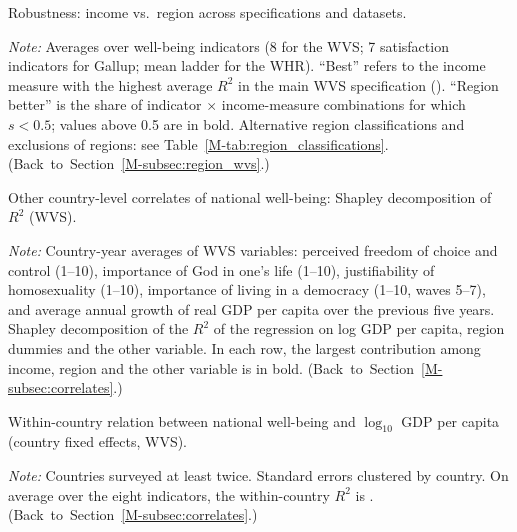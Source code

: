 \documentclass[12pt]{article}
\begin{document}
\begin{table}[htbp]
    \centering
    \caption{Robustness: income vs.\ region across specifications and datasets.}\label{tab:robustness}
    \begin{adjustbox}{max width=\textwidth}
    
    \end{adjustbox}
    \begin{minipage}{\textwidth}\footnotesize \textit{Note:} Averages over well-being indicators (8 for the WVS; 7 satisfaction indicators for Gallup; mean ladder for the WHR). ``Best'' refers to the income measure with the highest average $R^2$ in the main WVS specification (\bestIncome). ``Region better'' is the share of indicator $\times$ income-measure combinations for which $s < 0.5$; values above 0.5 are in bold. Alternative region classifications and exclusions of regions: see Table~\ref{M-tab:region_classifications}. \hfill(Back~to~Section~\ref{M-subsec:region_wvs}.)\end{minipage}
\end{table}

\begin{table}[htbp]
    \centering
    \caption{Other country-level correlates of national well-being: Shapley decomposition of $R^2$ (WVS).}\label{tab:correlates}
    \begin{adjustbox}{max width=\textwidth}
    
    \end{adjustbox}
    \begin{minipage}{\textwidth}\footnotesize \textit{Note:} Country-year averages of WVS variables: perceived freedom of choice and control (1--10), importance of God in one's life (1--10), justifiability of homosexuality (1--10), importance of living in a democracy (1--10, waves 5--7), and average annual growth of real GDP per capita over the previous five years. Shapley decomposition of the $R^2$ of the regression on log GDP per capita, region dummies and the other variable. In each row, the largest contribution among income, region and the other variable is in bold. \hfill(Back~to~Section~\ref{M-subsec:correlates}.)\end{minipage}
\end{table}

\begin{table}[htbp]
    \centering
    \caption{Within-country relation between national well-being and $\log_{10}$ GDP per capita (country fixed effects, WVS).}\label{tab:within}
    \begin{adjustbox}{max width=\textwidth}
    
    \end{adjustbox}
    \begin{minipage}{\textwidth}\footnotesize \textit{Note:} Countries surveyed at least twice. Standard errors clustered by country. On average over the eight indicators, the within-country $R^2$ is \meanWithinRtwo. \hfill(Back~to~Section~\ref{M-subsec:correlates}.)\end{minipage}
\end{table}
\end{document}
